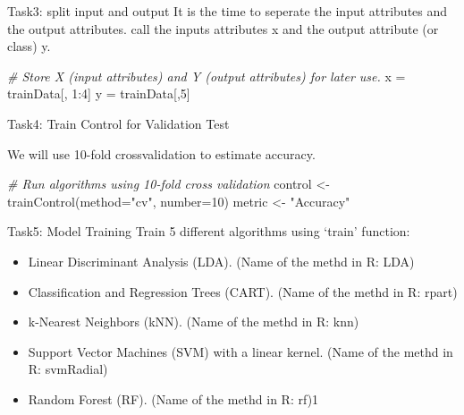 \documentclass[
]{article}
\newenvironment{Shaded}{\begin{snugshade}}{\end{snugshade}}
\newcommand{\AttributeTok}[1]{\textcolor[rgb]{0.77,0.63,0.00}{#1}}
\newcommand{\CommentTok}[1]{\textcolor[rgb]{0.56,0.35,0.01}{\textit{#1}}}
\newcommand{\DecValTok}[1]{\textcolor[rgb]{0.00,0.00,0.81}{#1}}
\newcommand{\FunctionTok}[1]{\textcolor[rgb]{0.00,0.00,0.00}{#1}}
\newcommand{\NormalTok}[1]{#1}
\newcommand{\OtherTok}[1]{\textcolor[rgb]{0.56,0.35,0.01}{#1}}
\newcommand{\SpecialCharTok}[1]{\textcolor[rgb]{0.00,0.00,0.00}{#1}}
\newcommand{\StringTok}[1]{\textcolor[rgb]{0.31,0.60,0.02}{#1}}
\providecommand{\tightlist}{%
  \setlength{\itemsep}{0pt}\setlength{\parskip}{0pt}}
\begin{document}
Task3: split input and output It is the time to seperate the input
attributes and the output attributes. call the inputs attributes x and
the output attribute (or class) y.

\begin{Shaded}
\begin{Highlighting}[]
\CommentTok{\# Store X (input attributes) and Y (output attributes) for later use.}
\NormalTok{x }\OtherTok{=}\NormalTok{ trainData[, }\DecValTok{1}\SpecialCharTok{:}\DecValTok{4}\NormalTok{]}
\NormalTok{y }\OtherTok{=}\NormalTok{ trainData[,}\DecValTok{5}\NormalTok{]}
\end{Highlighting}
\end{Shaded}

Task4: Train Control for Validation Test

We will use 10-fold crossvalidation to estimate accuracy.

\begin{Shaded}
\begin{Highlighting}[]
\CommentTok{\# Run algorithms using 10{-}fold cross validation}
\NormalTok{control }\OtherTok{\textless{}{-}} \FunctionTok{trainControl}\NormalTok{(}\AttributeTok{method=}\StringTok{"cv"}\NormalTok{, }\AttributeTok{number=}\DecValTok{10}\NormalTok{)}
\NormalTok{metric }\OtherTok{\textless{}{-}} \StringTok{"Accuracy"}
\end{Highlighting}
\end{Shaded}

Task5: Model Training Train 5 different algorithms using `train'
function:

\begin{itemize}
\tightlist
\item
  Linear Discriminant Analysis (LDA). (Name of the methd in R: LDA)
\item
  Classification and Regression Trees (CART). (Name of the methd in R:
  rpart)
\item
  k-Nearest Neighbors (kNN). (Name of the methd in R: knn)
\item
  Support Vector Machines (SVM) with a linear kernel. (Name of the methd
  in R: svmRadial)
\item
  Random Forest (RF). (Name of the methd in R: rf)1
\end{itemize}
\end{document}
